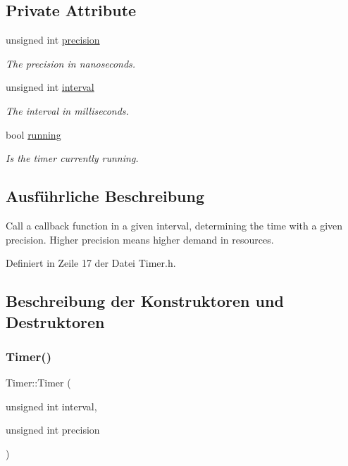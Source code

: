 \subsection*{Private Attribute}
\begin{DoxyCompactItemize}
\item 
unsigned int \hyperlink{class_timer_a3d1026dd88596a97cb6b768f475ed57f}{precision}
\begin{DoxyCompactList}\small\item\em The precision in nanoseconds. \end{DoxyCompactList}\item 
unsigned int \hyperlink{class_timer_aaf9bce1286b714658a0f4484d8fee960}{interval}
\begin{DoxyCompactList}\small\item\em The interval in milliseconds. \end{DoxyCompactList}\item 
bool \hyperlink{class_timer_a3b8bb57a0a252c88f85c0592715ea425}{running}
\begin{DoxyCompactList}\small\item\em Is the timer currently running. \end{DoxyCompactList}\end{DoxyCompactItemize}


\subsection{Ausführliche Beschreibung}
Call a callback function in a given interval, determining the time with a given precision. Higher precision means higher demand in resources. 

Definiert in Zeile 17 der Datei Timer.\+h.



\subsection{Beschreibung der Konstruktoren und Destruktoren}
\mbox{\label{class_timer_a5b659c4fb572c549dad183a7b32b08df}} 
\subsubsection{\texorpdfstring{Timer()}{Timer()}}
{\footnotesize\ttfamily Timer\+::\+Timer (\begin{DoxyParamCaption}\item[{unsigned int}]{interval,  }\item[{unsigned int}]{precision }\end{DoxyParamCaption})}

